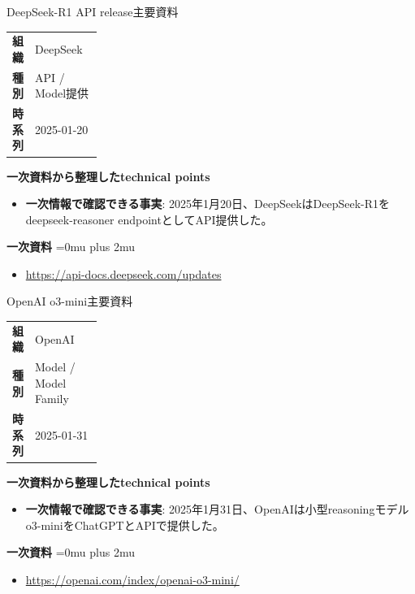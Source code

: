 \begin{technicalnote}{DeepSeek-R1 API release}{主要資料}
\begingroup
\begin{tabularx}{\linewidth}{@{}>{\bfseries}p{0.22\linewidth}X@{}}
組織 & DeepSeek \\
種別 & API / Model提供 \\
時系列 & 2025-01-20 \\
\end{tabularx}
\smallskip
\begin{minipage}{\linewidth}
{\bfseries 一次資料から整理したtechnical points}
\begin{itemize}[leftmargin=1.5em,itemsep=0.35em]
\item \textbf{一次情報で確認できる事実}: 2025年1月20日、DeepSeekはDeepSeek-R1をdeepseek-reasoner endpointとしてAPI提供した。
\end{itemize}
\begin{samepage}
{\bfseries 一次資料}
\begingroup\sloppy
\Urlmuskip=0mu plus 2mu\relax
\begin{itemize}[leftmargin=1.5em,itemsep=0.25em]
\item {\scriptsize\url{https://api-docs.deepseek.com/updates}}
\end{itemize}
\endgroup
\end{samepage}
\end{minipage}
\endgroup
\end{technicalnote}
\medskip

\begin{technicalnote}{OpenAI o3-mini}{主要資料}
\begingroup
\begin{tabularx}{\linewidth}{@{}>{\bfseries}p{0.22\linewidth}X@{}}
組織 & OpenAI \\
種別 & Model / Model Family \\
時系列 & 2025-01-31 \\
\end{tabularx}
\smallskip
\begin{minipage}{\linewidth}
{\bfseries 一次資料から整理したtechnical points}
\begin{itemize}[leftmargin=1.5em,itemsep=0.35em]
\item \textbf{一次情報で確認できる事実}: 2025年1月31日、OpenAIは小型reasoningモデルo3-miniをChatGPTとAPIで提供した。
\end{itemize}
\begin{samepage}
{\bfseries 一次資料}
\begingroup\sloppy
\Urlmuskip=0mu plus 2mu\relax
\begin{itemize}[leftmargin=1.5em,itemsep=0.25em]
\item {\scriptsize\url{https://openai.com/index/openai-o3-mini/}}
\end{itemize}
\endgroup
\end{samepage}
\end{minipage}
\endgroup
\end{technicalnote}
\medskip

